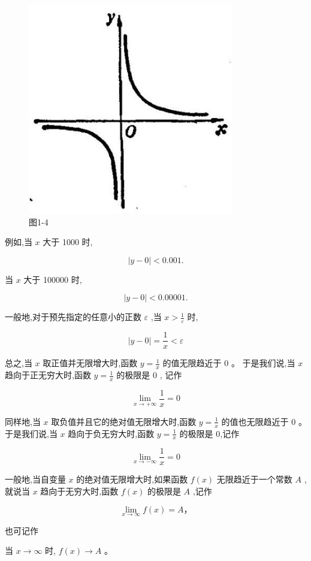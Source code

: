 \documentclass[lang=cn,newtx,12pt,scheme=chinese]{elegantbook}
\begin{document}
\begin{figure}[h]
	\centering
	\includegraphics[max width=0.8\textwidth]{images/01912c18-5c3f-733d-b775-749ba9897a9d_21_654074.jpg}
	\caption{图1-4}
\end{figure}

例如,当 \(x\) 大于 1000 时,

\[
\left| {y - 0}\right| < {0.001}\text{.}
\]

当 \(x\) 大于 100000 时,

\[
\left| {y - 0}\right| < {0.00001}\text{.}
\]

一般地,对于预先指定的任意小的正数 \(\varepsilon\) ,当 \(x > \frac{1}{\varepsilon }\) 时,

\[
\left| {y - 0}\right| = \frac{1}{x} < \varepsilon
\]

总之,当 \(x\) 取正值并无限增大时,函数 \(y = \frac{1}{x}\) 的值无限趋近于 0 。 于是我们说,当 \(x\) 趋向于正无穷大时,函数 \(y = \frac{1}{x}\) 的极限是 0 , 记作

\[
\mathop{\lim }\limits_{{x \rightarrow + \infty }}\frac{1}{x} = 0
\]

同样地,当 \(x\) 取负值并且它的绝对值无限增大时,函数 \(y = \frac{1}{x}\) 的值也无限趋近于 0 。 于是我们说,当 \(x\) 趋向于负无穷大时,函数 \(y = \frac{1}{x}\) 的极限是 0,记作

\[
\mathop{\lim }\limits_{{x \rightarrow - \infty }}\frac{1}{x} = 0
\]
\begin{definition} 
一般地,当自变量 \(x\) 的绝对值无限增大时,如果函数 \(f\left( x\right)\) 无限趋近于一个常数 \(A\) ,就说当 \(x\) 趋向于无穷大时,函数 \(f\left( x\right)\) 的极限是 \(A\) ,记作

\[
\mathop{\lim }\limits_{{x \rightarrow \infty }}f\left( x\right) = A \text{，}
\]

也可记作

当 \(x \rightarrow \infty\) 时, \(f\left( x\right) \rightarrow A\) 。

\end{definition}
\end{document}
